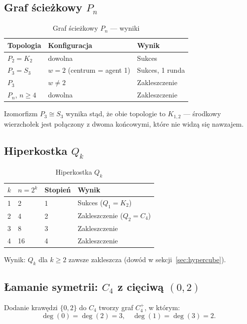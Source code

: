 \documentclass[12pt,a4paper]{article}
\theoremstyle{plain}
\theoremstyle{definition}
\theoremstyle{remark}
\begin{document}
\subsection{Graf ścieżkowy $P_n$}

\begin{table}[h]
\centering
\caption{Graf ścieżkowy $P_n$ — wyniki}
\begin{tabular}{lll}
\toprule
Topologia & Konfiguracja & Wynik \\
\midrule
$P_2 = K_2$ & dowolna & Sukces \\
$P_3 = S_3$ & $w = 2$ (centrum = agent 1) & Sukces, 1 runda \\
$P_3$ & $w \ne 2$ & Zakleszczenie \\
$P_n$, $n \ge 4$ & dowolna & Zakleszczenie \\
\bottomrule
\end{tabular}
\end{table}

Izomorfizm $P_3 \cong S_3$ wynika stąd, że obie topologie to $K_{1,2}$ — środkowy wierzchołek jest połączony z dwoma końcowymi, które nie widzą się nawzajem.

\subsection{Hiperkostka $Q_k$}

\begin{table}[h]
\centering
\caption{Hiperkostka $Q_k$}
\begin{tabular}{llll}
\toprule
$k$ & $n = 2^k$ & Stopień & Wynik \\
\midrule
1 & 2 & 1 & Sukces ($Q_1 = K_2$) \\
2 & 4 & 2 & Zakleszczenie ($Q_2 = C_4$) \\
3 & 8 & 3 & Zakleszczenie \\
4 & 16 & 4 & Zakleszczenie \\
\bottomrule
\end{tabular}
\end{table}

Wynik: $Q_k$ dla $k \ge 2$ zawsze zakleszcza (dowód w sekcji~\ref{sec:hypercube}).

\subsection{Łamanie symetrii: $C_4$ z cięciwą $(0,2)$}

Dodanie krawędzi $\{0,2\}$ do $C_4$ tworzy graf $C_4^+$, w którym:
$$\deg(0) = \deg(2) = 3, \quad \deg(1) = \deg(3) = 2.$$
\end{document}
